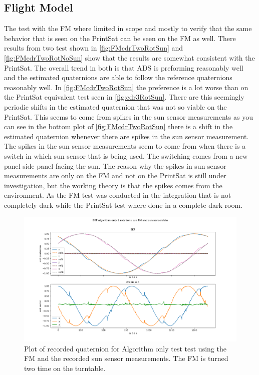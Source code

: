 \subsection{Flight Model}
The test with the FM where limited in scope and mostly to verify that the same behavior that is seen on the PrintSat can be seen on the FM as well. There results from two test shown in \autoref{fig:FMcdrTwoRotSun} and \autoref{fig:FMcdrTwoRotNoSun} show that the results are somewhat consistent with the PrintSat. The overall trend in both is that ADS is preforming reasonably well and the estimated quaternions are able to follow the reference quaternions reasonably well. In \autoref{fig:FMcdrTwoRotSun} the preference is a lot worse than on the PrintSat equivalent test seen in \autoref{fig:cdr3RotSun}. There are this seemingly periodic shifts in the estimated quaternion that was not so viable on the PrintSat. This seems to come from spikes in the sun sensor measurements as you can see in the bottom plot of \autoref{fig:FMcdrTwoRotSun} there is a shift in the estimated quaternion whenever there are spikes in the sun sensor measurement. The spikes in the sun sensor measurements seem to come from when there is a switch in which sun sensor that is being used. The switching comes from a new panel side panel facing the sun. The reason why the spikes in sun sensor measurements are only on the FM and not on the PrintSat is still under investigation, but the working theory is that the spikes comes from the environment. As the FM test was conducted in the integration that is not completely dark while the PrintSat test where done in a complete dark room. 

\begin{figure}[tbp]
	\centering
	\includegraphics[width=1\columnwidth]{./Pictures/test1EKFandSUN}
	\caption{Plot of recorded quaternion for Algorithm only test test using the FM and the recorded sun sensor measurements. The FM is turned two time on the turntable.}
	\label{fig:FMcdrTwoRotSun}
\end{figure}

